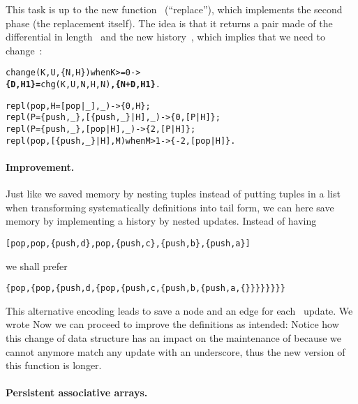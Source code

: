 This task is up to the new function~ (``replace''),
which implements the second phase (the replacement itself). The idea
is that it returns a pair made of the differential in
length~ and the new history~, which implies
that we need to change~:
\begin{alltt}
change(K,U,\{N,H\}) when K >= 0 ->
\hfill\textbf{\{D,H1\} =} chg(K,U,N,H,N)\textbf{, \{N+D,H1\}}.

repl(       pop,   H=[pop|\_],\_)            -> \{ 0,      H\};
repl(P=\{push,\_\},[\{push,\_\}|H],\_)            -> \{ 0,  [P|H]\};
repl(P=\{push,\_\},     [pop|H],\_)            -> \{ 2,  [P|H]\};
repl(       pop,[\{push,\_\}|H],M) when M > 1 -> \{-2,[pop|H]\}.
\end{alltt}

\medskip

\paragraph{Improvement.}

Just like  we saved memory by nesting tuples
instead of putting tuples in a list when transforming systematically
definitions into tail form, we can here save memory by implementing a
history by nested updates. Instead of having
\begin{center}
\texttt{[pop,pop,\{push,d\},pop,\{push,c\},\{push,b\},\{push,a\}]}
\end{center}
we shall prefer
\begin{center}
\texttt{\{pop,\{pop,\{push,d,\{pop,\{push,c,\{push,b,\{push,a,\{\}\}\}\}\}\}\}\}}
\end{center}
This alternative encoding leads to save a node and an edge for each
~update. We wrote  Now we can
proceed to improve the definitions as intended:
 Notice how this change of data structure
has an impact on the maintenance of  because we cannot
anymore match any update with an underscore, thus the new version of
this function is longer.

\medskip

\paragraph{Persistent associative arrays.}

